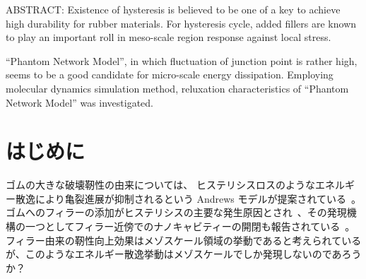 \documentclass[uplatex,10pt,a4paper,twocolumn]{jsarticle}
\begin{document}


\begin{spacing}{0.95}
ABSTRACT: 
Existence of hysteresis is believed to be one of a key to achieve high durability for rubber materials.
For hysteresis cycle, added fillers are known to play an important roll in meso-scale region response against local stress.

``Phantom Network Model'', in which fluctuation of junction point is rather high, seems to be a good candidate for micro-scale energy dissipation.
Employing molecular dynamics simulation method, reluxation characteristics of ``Phantom Network Model'' was investigated.
\end{spacing}

\section{はじめに}

ゴムの大きな破壊靭性の由来については、 ヒステリシスロスのようなエネルギー散逸により亀裂進展が抑制されるという Andrews モデルが提案されている~\cite{Andrews1977}。
ゴムへのフィラーの添加がヒステリシスの主要な発生原因とされ~\cite{Grosch1968}、その発現機構の一つとしてフィラー近傍でのナノキャビティーの開閉も報告されている~\cite{Zhang2013}。
フィラー由来の靭性向上効果はメゾスケール領域の挙動であると考えられているが、このようなエネルギー散逸挙動はメゾスケールでしか発現しないのであろうか？
\end{document}
